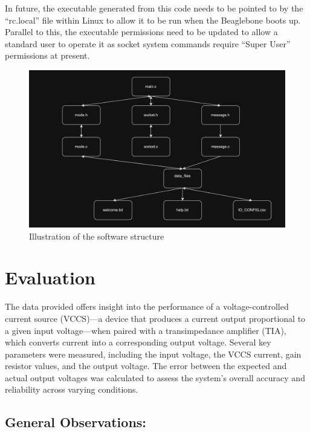 \documentclass[conference]{IEEEtran}
\begin{document}
In future, the executable generated from this code needs to be pointed to by the “rc.local” file within Linux to allow it to be run when the Beaglebone boots up. Parallel to this, the executable permissions need to be updated to allow a standard user to operate it as socket system commands require “Super User” permissions at present.

\begin{figure}
    \centering
    \includegraphics[width=\linewidth]{SoftwareGraph.png}
    \caption{Illustration of the software structure}
    \label{fig:8}
\end{figure}


\section{Evaluation}


The data provided offers insight into the performance of a voltage-controlled current source (VCCS)—a device that produces a current output proportional to a given input voltage—when paired with a transimpedance amplifier (TIA), which converts current into a corresponding output voltage. Several key parameters were measured, including the input voltage, the VCCS current, gain resistor values, and the output voltage. The error between the expected and actual output voltages was calculated to assess the system's overall accuracy and reliability across varying conditions.\\

\subsection{General Observations:}
\end{document}
